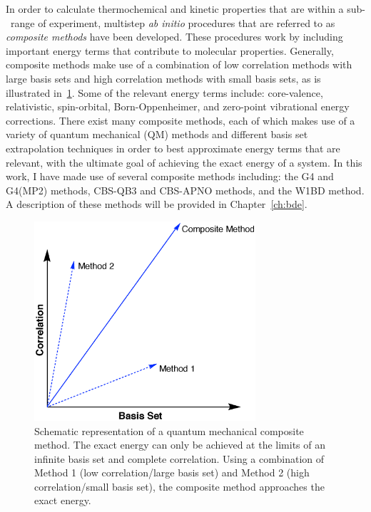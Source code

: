 \begin{doublespace}
In order to calculate thermochemical and kinetic properties that are within a
sub-\kcalmol\ range of experiment, multistep \emph{ab initio} procedures that
are referred to as \emph{composite methods} have been
developed.\cite{Karton2016} These procedures work by including important energy
terms that contribute to molecular properties. Generally, composite methods
make use of a combination of low correlation methods with large basis sets and
high correlation methods with small basis sets, as is illustrated
in~\ref{fig:comp}. Some of the relevant energy terms include: core-valence,
relativistic, spin-orbital, Born-Oppenheimer, and zero-point vibrational energy
corrections. There exist many composite methods, each of which makes use of a
variety of quantum mechanical (QM) methods and different basis set
extrapolation techniques in order to best approximate energy terms that are
relevant, with the ultimate goal of achieving the exact energy of a system. In
this work, I have made use of several composite methods including: the G4 and
G4(MP2) methods,\cite{Curtiss2007,Curtiss2007a} CBS-QB3 and CBS-APNO
methods,\cite{Montgomery1999,Montgomery2000,Ochterski1996} and the W1BD
method.\cite{Barnes2009} A description of these methods will be provided in
Chapter~\ref{ch:bde}.

\begin{figure}[htb]
  \centering
  \includegraphics[height=20em]{figures/compositemethods.eps}
  \caption[Schematic representation of a quantum mechanical composite
  method.]{Schematic representation of a quantum mechanical composite method.
  The exact energy can only be achieved at the limits of an infinite basis set
  and complete correlation. Using a combination of Method 1 (low
  correlation/large basis set) and Method 2 (high correlation/small basis set),
  the composite method approaches the exact energy.} \label{fig:comp}
\end{figure}


\end{doublespace}
